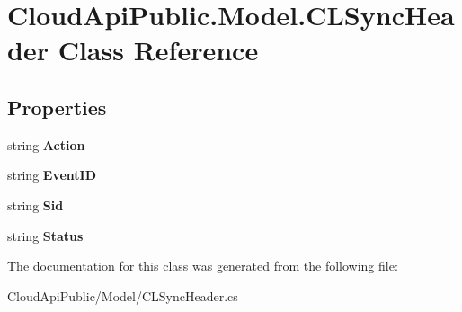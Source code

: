 \hypertarget{class_cloud_api_public_1_1_model_1_1_c_l_sync_header}{\section{Cloud\-Api\-Public.\-Model.\-C\-L\-Sync\-Header Class Reference}
\label{class_cloud_api_public_1_1_model_1_1_c_l_sync_header}
}
\subsection*{Properties}
\begin{DoxyCompactItemize}
\item 
\hypertarget{class_cloud_api_public_1_1_model_1_1_c_l_sync_header_a2b9860f19ab6e4c3fe3c81c7a626b4cc}{string {\bfseries Action}}\label{class_cloud_api_public_1_1_model_1_1_c_l_sync_header_a2b9860f19ab6e4c3fe3c81c7a626b4cc}

\item 
\hypertarget{class_cloud_api_public_1_1_model_1_1_c_l_sync_header_a45da43d7c74c332871dd6a39dd8b38e9}{string {\bfseries Event\-I\-D}}\label{class_cloud_api_public_1_1_model_1_1_c_l_sync_header_a45da43d7c74c332871dd6a39dd8b38e9}

\item 
\hypertarget{class_cloud_api_public_1_1_model_1_1_c_l_sync_header_ac7f0f4a2b52d79c13e94dd858a416a73}{string {\bfseries Sid}}\label{class_cloud_api_public_1_1_model_1_1_c_l_sync_header_ac7f0f4a2b52d79c13e94dd858a416a73}

\item 
\hypertarget{class_cloud_api_public_1_1_model_1_1_c_l_sync_header_a224c6a5e84d19e62aa729da12d47f57d}{string {\bfseries Status}}\label{class_cloud_api_public_1_1_model_1_1_c_l_sync_header_a224c6a5e84d19e62aa729da12d47f57d}

\end{DoxyCompactItemize}


The documentation for this class was generated from the following file\-:\begin{DoxyCompactItemize}
\item 
Cloud\-Api\-Public/\-Model/C\-L\-Sync\-Header.\-cs\end{DoxyCompactItemize}
